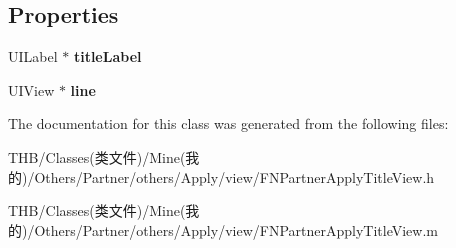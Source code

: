 \subsection*{Properties}
\begin{DoxyCompactItemize}
\item 
\mbox{\label{interface_f_n_partner_apply_title_view_a8f0939a2fdb0eec648c899da610fcba9}} 
U\+I\+Label $\ast$ {\bfseries title\+Label}
\item 
\mbox{\label{interface_f_n_partner_apply_title_view_a8ac13968e702a1ac5fd8381fef3316ad}} 
U\+I\+View $\ast$ {\bfseries line}
\end{DoxyCompactItemize}


The documentation for this class was generated from the following files\+:\begin{DoxyCompactItemize}
\item 
T\+H\+B/\+Classes(类文件)/\+Mine(我的)/\+Others/\+Partner/others/\+Apply/view/F\+N\+Partner\+Apply\+Title\+View.\+h\item 
T\+H\+B/\+Classes(类文件)/\+Mine(我的)/\+Others/\+Partner/others/\+Apply/view/F\+N\+Partner\+Apply\+Title\+View.\+m\end{DoxyCompactItemize}
